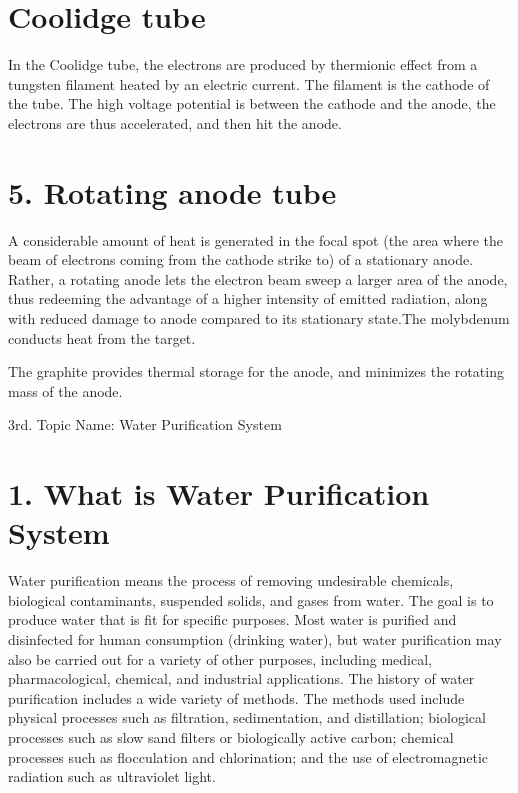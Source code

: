 \documentclass[12pt]{article}
\begin{document}
\section*{Coolidge tube}
In the Coolidge tube, the electrons are produced by thermionic effect from a tungsten filament heated by an electric current. The filament is the cathode of the tube. The high voltage potential is between the cathode and the anode, the electrons are thus accelerated, and then hit the anode.

\section*{5. Rotating anode tube}
A considerable amount of heat is generated in the focal spot (the area where the beam of electrons coming from the cathode strike to) of a stationary anode. Rather, a rotating anode lets the electron beam sweep a larger area of the anode, thus redeeming the advantage of a higher intensity of emitted radiation, along with reduced damage to anode compared to its stationary state.The molybdenum conducts heat from the target.

 The graphite provides thermal storage for the anode, and minimizes the rotating mass of the anode.
 
 
 
 \maketitle
 \clearpage
 3rd. Topic Name:  Water Purification System
 
 \section*{1.  What is Water Purification System }
 Water purification means the process of removing undesirable chemicals, biological contaminants, suspended solids, and gases from water. The goal is to produce water that is fit for specific purposes. Most water is purified and disinfected for human consumption (drinking water), but water purification may also be carried out for a variety of other purposes, including medical, pharmacological, chemical, and industrial applications. The history of water purification includes a wide variety of methods. The methods used include physical processes such as filtration, sedimentation, and distillation; biological processes such as slow sand filters or biologically active carbon; chemical processes such as flocculation and chlorination; and the use of electromagnetic radiation such as ultraviolet light.
 
\end{document}
